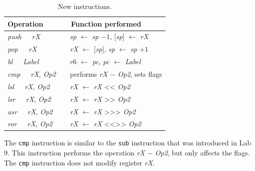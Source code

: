 \documentclass[epsfig,10pt,fullpage]{article} \addtolength{\textwidth}{1.5in}
\begin{document}
\begin{table}[H]
\begin{center}
\begin{tabular}{l|l}
\rule[-0.075in]{0in}{0.25in}Operation & ~~Function performed \\ \hline 
\rule[-0.075in]{0in}{0.25in}{\it push}~~~{\it rX} & ~~{\it sp} $\leftarrow$ {\it sp} $-1$, [{\it sp}] $\leftarrow$ {\it rX}\\ 
\rule[-0.075in]{0in}{0.25in}{\it pop}~~~{\it rX} & ~~{\it rX} $\leftarrow$ [{\it sp}], {\it
sp} $\leftarrow$ {\it sp} $+1$  \\ 
\rule[-0.075in]{0in}{0.25in}{\it bl}~~~{\it Label} & ~~$r6$ $\leftarrow$ {\it pc}, {\it pc} $\leftarrow$ {\it Label} \\ 
\rule[-0.075in]{0in}{0.25in}{\it cmp}~~~{\it rX}, {\it Op2} & ~~performs {\it rX} $-$ {\it Op2}, sets flags \\ 
\rule[-0.075in]{0in}{0.25in}{\it lsl}~~~{\it rX}, {\it Op2} & ~~{\it rX} $\leftarrow$ {\it
rX} <\hspace{-.25mm}< {\it Op2}\\ 
\rule[-0.075in]{0in}{0.25in}{\it lsr}~~~{\it rX}, {\it Op2} & ~~{\it rX} $\leftarrow$ {\it
rX} >\hspace{-0.25mm}> {\it Op2}\\ 
\rule[-0.075in]{0in}{0.25in}{\it asr}~~~{\it rX}, {\it Op2} & ~~{\it rX} $\leftarrow$ {\it
rX} >\hspace{-0.25mm}>\hspace{-0.25mm}> {\it Op2}\\ 
\rule[-0.075in]{0in}{0.25in}{\it ror}~~~{\it rX}, {\it Op2} & ~~{\it rX} $\leftarrow$ {\it
rX} <\hspace{-0.25mm}<\hspace{-0.25mm}>\hspace{-0.25mm}> {\it Op2}\\ 
\end{tabular}
\caption{New instructions.}
\label{tab:new_instr}
\end{center}
\end{table}

\noindent
The \texttt{cmp} instruction is similar to the \texttt{sub} instruction that was introduced in 
Lab 9. This instruction performs the operation {\it rX} $-$ {\it Op2}, but only affects the
flags. The \texttt{cmp} instruction does not modify register {\it rX}. 
\end{document}
